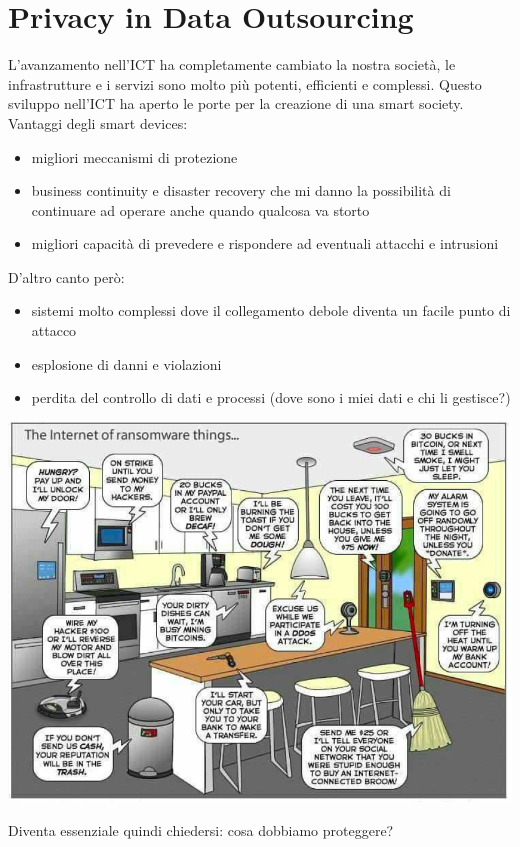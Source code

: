 \section{Privacy in Data Outsourcing}
L'avanzamento nell'ICT ha completamente cambiato la nostra società, le infrastrutture e i servizi sono molto più potenti, efficienti e complessi. Questo sviluppo nell'ICT ha aperto le porte per la creazione di una smart society. \\
Vantaggi degli smart devices:
\begin{itemize}
    \item migliori meccanismi di protezione
    \item business continuity e disaster recovery che mi danno la possibilità di continuare ad operare anche quando qualcosa va storto
    \item migliori capacità di prevedere e rispondere ad eventuali attacchi e intrusioni
\end{itemize}
D'altro canto però:
\begin{itemize}
    \item sistemi molto complessi dove il collegamento debole diventa un facile punto di attacco
    \item esplosione di danni e violazioni
    \item perdita del controllo di dati e processi (dove sono i miei dati e chi li gestisce?)
\end{itemize}
\begin{center}
    \includegraphics[scale=0.4]{img/com.png}
\end{center}
Diventa essenziale quindi chiedersi: cosa dobbiamo proteggere?
